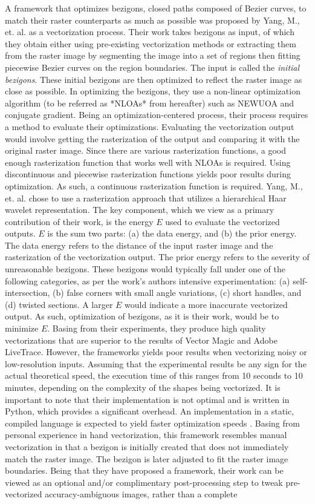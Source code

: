 A framework that optimizes bezigons, closed paths composed of Bezier curves, to match their raster counterparts as much as possible was proposed by Yang, M., et. al. as a vectorization process. Their work takes bezigons as input, of which they obtain either using pre-existing vectorization methods or extracting them from the raster image by segmenting the image into a set of regions then fitting piecewise Bezier curves on the region boundaries. The input is called the \textit{initial bezigons}. These initial bezigons are then optimized to reflect the raster image as close as possible. In optimizing the bezigons, they use a non-linear optimization algorithm (to be referred as *NLOAs* from hereafter) such as NEWUOA and conjugate gradient. Being an optimization-centered process, their process requires a method to evaluate their optimizations. Evaluating the vectorization output would involve getting the rasterization of the output and comparing it with the original raster image. Since there are various rasterization functions, a good enough rasterization function that works well with NLOAs is required. Using discontinuous and piecewise rasterization functions yields poor results during optimization. As such, a continuous rasterization function is required. Yang, M., et. al. chose to use a rasterization approach that utilizes a hierarchical Haar wavelet representation. The key component, which we view as a primary contribution of their work, is the energy $E$ used to evaluate the vectorized outputs. $E$ is the sum two parts: (a) the data energy, and (b) the prior energy. The data energy refers to the distance of the input raster image and the rasterization of the vectorization output. The prior energy refers to the severity of unreasonable bezigons. These bezigons would typically fall under one of the following categories, as per the work's authors intensive experimentation: (a) self-intersection, (b) false corners with small angle variations, (c) short handles, and (d) twisted sections. A larger $E$ would indicate a more inaccurate vectorized output. As such, optimization of bezigons, as it is their work, would be to minimize $E$. Basing from their experiments, they produce high quality vectorizations that are superior to the results of Vector Magic and Adobe LiveTrace. However, the frameworks yields poor results when vectorizing noisy or low-resolution inputs. Assuming that the experimental results be any sign for the actual theoretical speed, the execution time of this ranges from 10 seconds to 10 minutes, depending on the complexity of the shapes being vectorized. It is important to note that their implementation is not optimal and is written in Python, which provides a significant overhead. An implementation in a static, compiled language is expected to yield faster optimization speeds \cite{effectiveclipartimagevectorization}. Basing from personal experience in hand vectorization, this framework resembles manual vectorization in that a bezigon is initially created that does not immediately match the raster image. The bezigon is later adjusted to fit the raster image boundaries. Being that they have proposed a framework, their work can be viewed as an optional and/or complimentary post-processing step to tweak pre-vectorized accuracy-ambiguous images, rather than a complete 
